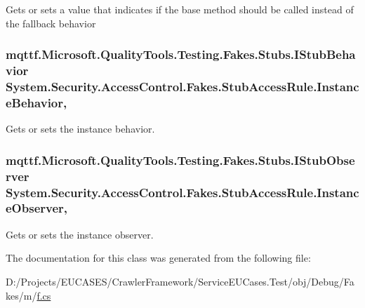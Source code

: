 Gets or sets a value that indicates if the base method should be called instead of the fallback behavior

\hypertarget{class_system_1_1_security_1_1_access_control_1_1_fakes_1_1_stub_access_rule_a91f9991f54fecf5798bc6acfaa999b4f}{
\subsubsection[{Instance\-Behavior}]{\setlength{\rightskip}{0pt plus 5cm}mqttf.\-Microsoft.\-Quality\-Tools.\-Testing.\-Fakes.\-Stubs.\-I\-Stub\-Behavior System.\-Security.\-Access\-Control.\-Fakes.\-Stub\-Access\-Rule.\-Instance\-Behavior\hspace{0.3cm}{\ttfamily [get]}, {\ttfamily [set]}}}\label{class_system_1_1_security_1_1_access_control_1_1_fakes_1_1_stub_access_rule_a91f9991f54fecf5798bc6acfaa999b4f}


Gets or sets the instance behavior.

\hypertarget{class_system_1_1_security_1_1_access_control_1_1_fakes_1_1_stub_access_rule_a3c8945177cdf5a980062d02e48d557d4}{
\subsubsection[{Instance\-Observer}]{\setlength{\rightskip}{0pt plus 5cm}mqttf.\-Microsoft.\-Quality\-Tools.\-Testing.\-Fakes.\-Stubs.\-I\-Stub\-Observer System.\-Security.\-Access\-Control.\-Fakes.\-Stub\-Access\-Rule.\-Instance\-Observer\hspace{0.3cm}{\ttfamily [get]}, {\ttfamily [set]}}}\label{class_system_1_1_security_1_1_access_control_1_1_fakes_1_1_stub_access_rule_a3c8945177cdf5a980062d02e48d557d4}


Gets or sets the instance observer.



The documentation for this class was generated from the following file\-:\begin{DoxyCompactItemize}
\item 
D\-:/\-Projects/\-E\-U\-C\-A\-S\-E\-S/\-Crawler\-Framework/\-Service\-E\-U\-Cases.\-Test/obj/\-Debug/\-Fakes/m/\hyperlink{m_2f_8cs}{f.\-cs}\end{DoxyCompactItemize}
